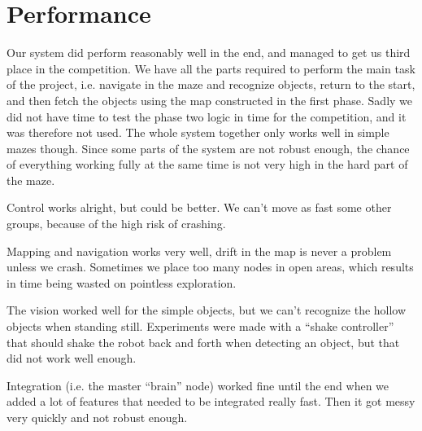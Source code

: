 \section{Performance}
Our system did perform reasonably well in the end, and managed to get us third place in the competition. 
We have all the parts required to perform the main task of the project, i.e. navigate in the maze and recognize objects, return to the start, and then fetch the objects using the map constructed in the first phase. 
Sadly we did not have time to test the phase two logic in time for the competition, and it was therefore not used.
The whole system together only works well in simple mazes though. 
Since some parts of the system are not robust enough, the chance of everything working fully at the same time is not very high in the hard part of the maze. 

Control works alright, but could be better. 
We can't move as fast some other groups, because of the high risk of crashing. 

Mapping and navigation works very well, drift in the map is never a problem unless we crash. Sometimes we place too many nodes in open areas, which results in time being wasted on pointless exploration.

The vision worked well for the simple objects, but we can't recognize the hollow objects when standing still. 
Experiments were made with a ``shake controller'' that should shake the robot back and forth when detecting an object, but that did not work well enough.

Integration (i.e. the master ``brain'' node) worked fine until the end when we added a lot of features that needed to be integrated really fast. Then it got messy very quickly and not robust enough.
